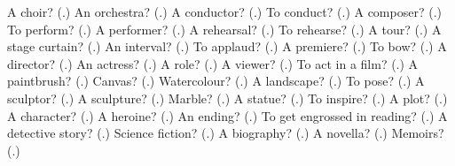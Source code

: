 \begin{tcolorbox}[breakable,colback=teal!4,colframe=teal!35!black,title={Before you move on}]
A choir? (\textbf{}.) An orchestra? (\textbf{}.) A conductor? (\textbf{}.) To conduct? (\textbf{}.) A composer? (\textbf{}.) To perform? (\textbf{}.) A performer? (\textbf{}.) A rehearsal? (\textbf{}.) To rehearse? (\textbf{}.) A tour? (\textbf{}.) A stage curtain? (\textbf{}.) An interval? (\textbf{}.) To applaud? (\textbf{}.) A premiere? (\textbf{}.) To bow? (\textbf{}.) A director? (\textbf{}.) An actress? (\textbf{}.) A role? (\textbf{}.) A viewer? (\textbf{}.) To act in a film? (\textbf{}.) A paintbrush? (\textbf{}.) Canvas? (\textbf{}.) Watercolour? (\textbf{}.) A landscape? (\textbf{}.) To pose? (\textbf{}.) A sculptor? (\textbf{}.) A sculpture? (\textbf{}.) Marble? (\textbf{}.) A statue? (\textbf{}.) To inspire? (\textbf{}.) A plot? (\textbf{}.) A character? (\textbf{}.) A heroine? (\textbf{}.) An ending? (\textbf{}.) To get engrossed in reading? (\textbf{}.) A detective story? (\textbf{}.) Science fiction? (\textbf{}.) A biography? (\textbf{}.) A novella? (\textbf{}.) Memoirs? (\textbf{}.)
\end{tcolorbox}
